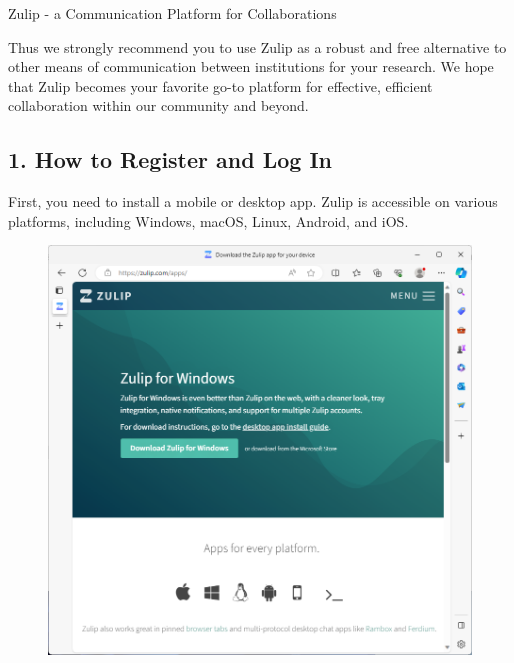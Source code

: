 \begin{coverpage}{Zulip - a Communication Platform for Collaborations}
{Thus we strongly recommend you to use Zulip as a robust and free alternative to other means of communication between institutions for your research. We hope that Zulip becomes your favorite go-to platform for effective, efficient collaboration within our community and beyond.

\subsection*{1. How to Register and Log In}
First, you need to install a mobile or desktop app. Zulip is accessible on various platforms, including Windows, macOS, Linux, Android, and iOS.
\newpage

\begin{figure}[h]
\includegraphics[width=\textwidth]{images/zulip-apps.png}
\end{figure}

}
\end{coverpage}
